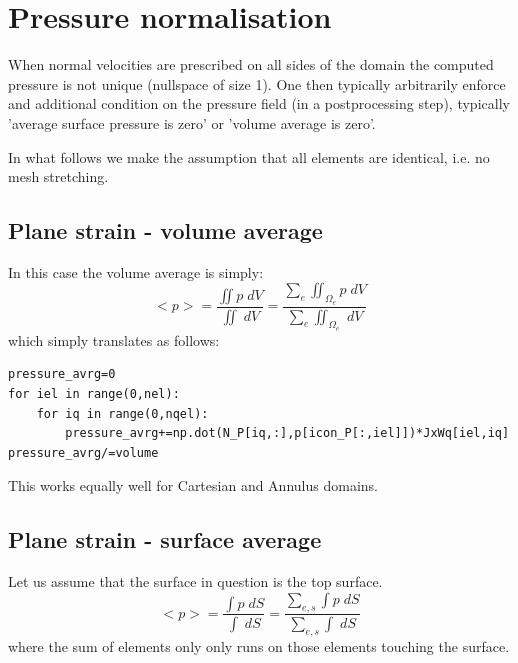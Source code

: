 \documentclass[a4paper,12pt]{article}
\begin{document}
\newpage
\section{Pressure normalisation}

When normal velocities are prescribed on all sides of the domain
the computed pressure is not unique (nullspace of size 1). 
One then typically arbitrarily enforce and additional condition
on the pressure field (in a postprocessing step), typically 'average surface pressure is zero'
or 'volume average is zero'. 

In what follows we make the assumption that all elements are identical, 
i.e. no mesh stretching. 

\subsection{Plane strain - volume average}

In this case the volume average is simply:
\[
<p> = \frac{\iint p \; dV}{\iint\; dV} = \frac{\sum_e \iint_{\Omega_e} p \; dV }{\sum_e \iint_{\Omega_e} \; dV}
\]
which simply translates as follows: 
\begin{lstlisting}
pressure_avrg=0
for iel in range(0,nel):
    for iq in range(0,nqel):
        pressure_avrg+=np.dot(N_P[iq,:],p[icon_P[:,iel]])*JxWq[iel,iq]
pressure_avrg/=volume
\end{lstlisting}
This works equally well for Cartesian and Annulus domains.




\subsection{Plane strain - surface average}

Let us assume that the surface in question is the top surface.
\begin{equation}
<p> = \frac{\int p \; dS}{\int\; dS} = \frac{\sum_{e,s} \int p \; dS }{\sum_{e,s} \int \; dS}
\label{eq:normp}
\end{equation}
where the sum of elements only only runs on those elements touching the surface.
\end{document}
